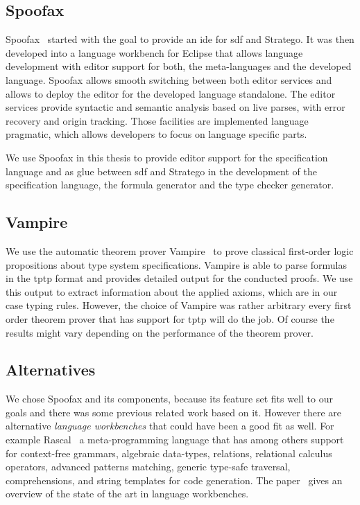 \subsection{Spoofax}
Spoofax~\cite{KatsV10} started with the goal to provide an \gls{ide}
for \gls{sdf} and Stratego. It was then developed into a language
workbench for Eclipse that allows language development with editor
support for both, the meta-languages and the developed
language. Spoofax allows smooth switching between both editor services
and allows to deploy the editor for the developed language
standalone. The editor services provide syntactic and semantic
analysis based on live parses, with error recovery and origin
tracking. Those facilities are implemented language pragmatic, which
allows developers to focus on language specific parts.

We use Spoofax in this thesis to provide editor support for the
specification language and as glue between \gls{sdf} and Stratego in
the development of the specification language, the formula generator
and the type checker generator.

\subsection{Vampire}
We use the automatic theorem prover Vampire~\cite{VoronkovVampire} to
prove classical first-order logic propositions about type system
specifications. Vampire is able to parse formulas in the \gls{tptp}
format and provides detailed output for the conducted proofs. We use
this output to extract information about the applied axioms, which are
in our case typing rules. However, the choice of Vampire was rather
arbitrary every first order theorem prover that has support for
\gls{tptp} will do the job. Of course the results might vary depending
on the performance of the theorem prover.

\subsection{Alternatives}
We chose Spoofax and its components, because its feature set fits well
to our goals and there was some previous related work based on
it. However there are alternative \emph{language workbenches} that
could have been a good fit as well. For example
Rascal~\cite{klint2009rascal} a meta-programming language that has
among others support for context-free grammars, algebraic data-types,
relations, relational calculus operators, advanced patterns matching,
generic type-safe traversal, comprehensions, and string templates for
code generation. The paper~\cite{workbenches} gives an overview of the
state of the art in language workbenches.

